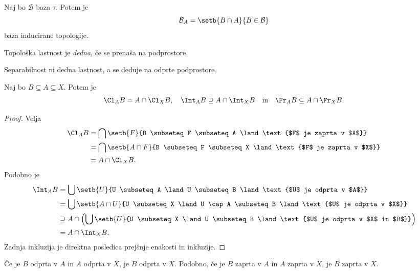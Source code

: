 \obvs

\begin{trditev}
Naj bo $\mathcal{B}$ baza $\tau$. Potem je
\[
\mathcal{B}_A = \setb{B \cap A}{B \in \mathcal{B}}
\]
baza inducirane topologije.
\end{trditev}

\obvs

\begin{definicija}
Topološka lastnost je
\emph{dedna}, če se prenaša na
podprostore.
\end{definicija}

\begin{opomba}
Separabilnost ni dedna lastnost, a se deduje na odprte podprostore.
\end{opomba}


\begin{trditev}
Naj bo $B \subseteq A \subseteq X$. Potem je
\[
\Cl_A B = A \cap \Cl_X B, \quad
\Int_A B \supseteq A \cap \Int_X B
\quad \text{in} \quad
\Fr_A B \subseteq A \cap \Fr_X B.
\]
\end{trditev}

\begin{proof}
Velja
\begin{align*}
\Cl_A B &=
\bigcap\setb{F}
{B \subseteq F \subseteq A \land \text{$F$ je zaprta v $A$}}
\\
&= \bigcap\setb{A \cap F}
{B \subseteq F \subseteq X \land \text{$F$ je zaprta v $X$}}
\\
&= A \cap \Cl_X B.
\end{align*}
Podobno je
\begin{align*}
\Int_A B &=
\bigcup\setb{U}
{U \subseteq A \land U \subseteq B \land
\text{$U$ je odprta v $A$}}
\\
&= \bigcup\setb{A \cap U}
{U \subseteq X \land U \cap A \subseteq B \land
\text{$U$ je odprta v $X$}}
\\
&\supseteq A \cap \left(\bigcup\setb{U}
{U \subseteq X \land U \subseteq B \land
\text{$U$ je odprta v $X$ in $B$}}\right)
\\
&= A \cap \Int_X B.
\end{align*}
Zadnja inkluzija je direktna posledica prejšnje enakosti in
inkluzije.
\end{proof}

\begin{trditev}
Če je $B$ odprta v $A$ in $A$ odprta v $X$, je $B$ odprta v $X$.
Podobno, če je $B$ zaprta v $A$ in $A$ zaprta v $X$, je $B$ zaprta
v $X$.
\end{trditev}

